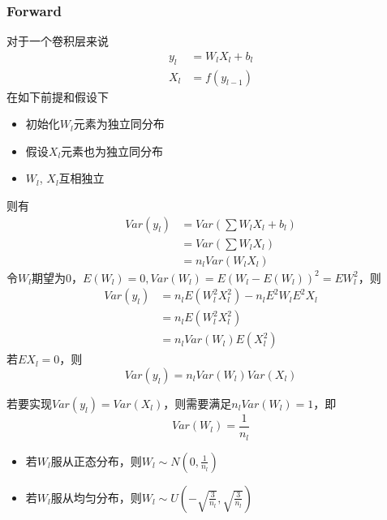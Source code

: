 \subsubsection{Forward}
对于一个卷积层来说
\begin{equation}
    \begin{split}
        y_l &= W_l X_l + b_l\\
        X_l &= f(y_{l-1})
    \end{split}
\end{equation}
在如下前提和假设下
\begin{itemize}
    \item 初始化$W_l$元素为独立同分布
    \item 假设$X_l$元素也为独立同分布
    \item $W_l$, $X_l$互相独立
\end{itemize}
则有
\begin{equation}
    \begin{split}
        Var(y_l) &= Var(\sum W_l X_l + b_l)\\
        &= Var(\sum W_l X_l) \\
        &= n_l Var(W_l X_l)
    \end{split}
\end{equation}
令$W_l$期望为0，$E(W_l) = 0, Var(W_l) = E(W_l - E(W_l))^2 = EW_l^2$，则
\begin{equation}
    \begin{split}
        Var(y_l) &= n_l E(W_l^2X_l^2) - n_l E^2W_l E^2 X_l \\
        &= n_l E(W_l^2X_l^2) \\
        &= n_l Var(W_l)E(X_l^2)
    \end{split}
\end{equation}
若$EX_l = 0$，则
\begin{equation}
    Var(y_l) = n_l Var(W_l)Var(X_l)
\end{equation}

若要实现$Var(y_l) = Var(X_l)$，则需要满足$n_l Var(W_l) = 1$，即
\begin{equation}
    Var(W_l) = \frac{1}{n_l}
\end{equation}

\begin{itemize}
    \item 若$W_l$服从正态分布，则$W_l \sim N(0, \frac{1}{n_l})$
    \item 若$W_l$服从均匀分布，则$W_l \sim U(-\sqrt{\frac{3}{n_l}}, \sqrt{\frac{3}{n_l}})$
\end{itemize}

